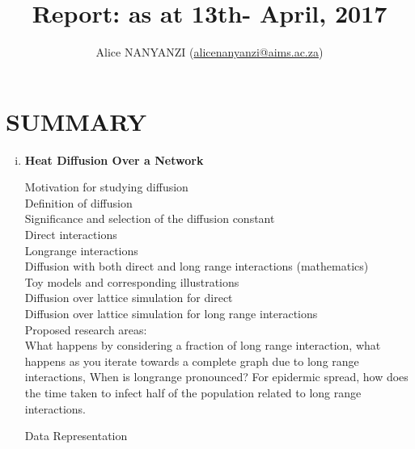 \documentclass[10pt,a4paper]{article}
\author{Alice NANYANZI (\href{mailto:alicenanyanzi@aims.ac.za}{alicenanyanzi@aims.ac.za})}
\title{Report: as at 13th- April, 2017}
\begin{document}
\maketitle
\section*{SUMMARY }
\begin{enumerate}[i)]
\item \textbf{Heat Diffusion Over a Network}

Motivation for studying diffusion\\
Definition of diffusion\\
Significance and selection of the diffusion constant\\
Direct interactions\\
Longrange interactions\\
Diffusion with both direct and long range interactions (mathematics)\\
Toy models and corresponding illustrations\\
Diffusion over lattice simulation for direct\\
Diffusion over lattice simulation for long range interactions\\

Proposed research areas:\\
What happens by considering a fraction of long range interaction, what happens as you iterate towards a complete graph due to long range interactions, When is longrange pronounced? For epidermic spread, how does the time taken to infect half of the population related to long range interactions.


	
	
	Data Representation\\


\end{enumerate}
\end{document}
